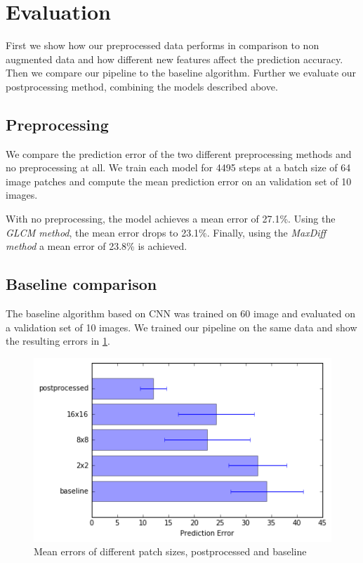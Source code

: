 \documentclass[10pt,conference,compsocconf]{IEEEtran}
\begin{document}


\section{Evaluation}
First we show how our preprocessed data performs in comparison to non augmented data and how different new features affect the prediction accuracy. Then we compare our pipeline to the baseline algorithm. Further we evaluate our postprocessing method, combining the models described above. 

\subsection{Preprocessing}

We compare the prediction error of the two different preprocessing methods and no preprocessing at all.
We train each model for 4495 steps at a batch size of 64 image patches and compute the mean prediction error on an validation set of 10 images.

With no preprocessing, the model achieves a mean error of 27.1\%.
Using the \emph{GLCM method}, the mean error drops to 23.1\%.
Finally, using the \emph{MaxDiff method} a mean error of 23.8\% is achieved.

\subsection{Baseline comparison}
The baseline algorithm based on CNN was trained on 60 image and evaluated on a validation set of 10 images. We trained our pipeline on the same data and show the resulting errors in \ref{fig:baseline}. 

\begin{figure}
	\centering
	\includegraphics[width=.8\columnwidth]{pictures/baseline}
	\caption{Mean errors of different patch sizes, postprocessed and baseline}
	\label{fig:baseline}
\end{figure}
\end{document}
